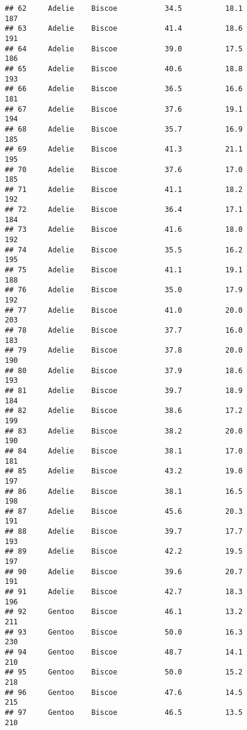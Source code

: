 \documentclass[
]{article}
\begin{document}
\begin{verbatim}
## 62     Adelie    Biscoe           34.5          18.1               187
## 63     Adelie    Biscoe           41.4          18.6               191
## 64     Adelie    Biscoe           39.0          17.5               186
## 65     Adelie    Biscoe           40.6          18.8               193
## 66     Adelie    Biscoe           36.5          16.6               181
## 67     Adelie    Biscoe           37.6          19.1               194
## 68     Adelie    Biscoe           35.7          16.9               185
## 69     Adelie    Biscoe           41.3          21.1               195
## 70     Adelie    Biscoe           37.6          17.0               185
## 71     Adelie    Biscoe           41.1          18.2               192
## 72     Adelie    Biscoe           36.4          17.1               184
## 73     Adelie    Biscoe           41.6          18.0               192
## 74     Adelie    Biscoe           35.5          16.2               195
## 75     Adelie    Biscoe           41.1          19.1               188
## 76     Adelie    Biscoe           35.0          17.9               192
## 77     Adelie    Biscoe           41.0          20.0               203
## 78     Adelie    Biscoe           37.7          16.0               183
## 79     Adelie    Biscoe           37.8          20.0               190
## 80     Adelie    Biscoe           37.9          18.6               193
## 81     Adelie    Biscoe           39.7          18.9               184
## 82     Adelie    Biscoe           38.6          17.2               199
## 83     Adelie    Biscoe           38.2          20.0               190
## 84     Adelie    Biscoe           38.1          17.0               181
## 85     Adelie    Biscoe           43.2          19.0               197
## 86     Adelie    Biscoe           38.1          16.5               198
## 87     Adelie    Biscoe           45.6          20.3               191
## 88     Adelie    Biscoe           39.7          17.7               193
## 89     Adelie    Biscoe           42.2          19.5               197
## 90     Adelie    Biscoe           39.6          20.7               191
## 91     Adelie    Biscoe           42.7          18.3               196
## 92     Gentoo    Biscoe           46.1          13.2               211
## 93     Gentoo    Biscoe           50.0          16.3               230
## 94     Gentoo    Biscoe           48.7          14.1               210
## 95     Gentoo    Biscoe           50.0          15.2               218
## 96     Gentoo    Biscoe           47.6          14.5               215
## 97     Gentoo    Biscoe           46.5          13.5               210

\end{verbatim}
\end{document}
